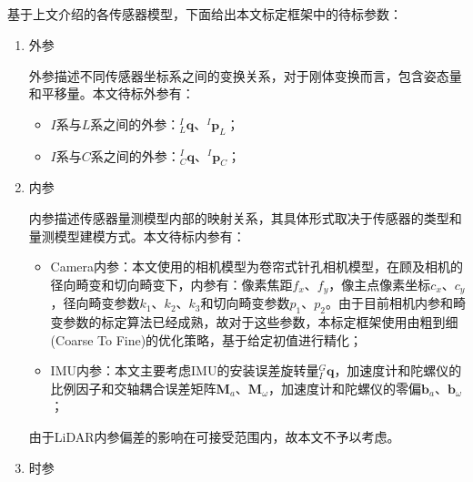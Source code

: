 \subsection{}
\label{suubsubsec:calib_param}
基于上文介绍的各传感器模型，下面给出本文标定框架中的待标参数：
\begin{enumerate}
  \item 外参

        外参描述不同传感器坐标系之间的变换关系，对于刚体变换而言，包含姿态量和平移量。本文待标外参有：
        \begin{itemize}
          \item $I$系与$L$系之间的外参：${^{I}_{L}}\boldsymbol{q}$、${^{I}}\boldsymbol{p}_{L}$；
          \item $I$系与$C$系之间的外参：${^{I}_{C}}\boldsymbol{q}$、${^{I}}\boldsymbol{p}_{C}$；
        \end{itemize}

  \item 内参

        内参描述传感器量测模型内部的映射关系，其具体形式取决于传感器的类型和量测模型建模方式。本文待标内参有：
        \begin{itemize}
          \item Camera内参：本文使用的相机模型为卷帘式针孔相机模型，在顾及相机的径向畸变和切向畸变下，内参有：像素焦距$f_x$、$f_y$，像主点像素坐标$c_x$、$c_y$，径向畸变参数$k_1$、$k_2$、$k_3$和切向畸变参数$p_1$、$p_2$。由于目前相机内参和畸变参数的标定算法已经成熟，故对于这些参数，本标定框架使用由粗到细(Coarse To Fine)的优化策略，基于给定初值进行精化；
          \item IMU内参：本文主要考虑IMU的安装误差旋转量${^{G}_{I}\boldsymbol{q}}$，加速度计和陀螺仪的比例因子和交轴耦合误差矩阵$\boldsymbol{M}_{a}$、$\boldsymbol{M}_{\omega}$，加速度计和陀螺仪的零偏$\boldsymbol{b}_a$、$\boldsymbol{b}_\omega$；
        \end{itemize}
        由于LiDAR内参偏差的影响在可接受范围内，故本文不予以考虑。
  \item 时参


\end{enumerate}
